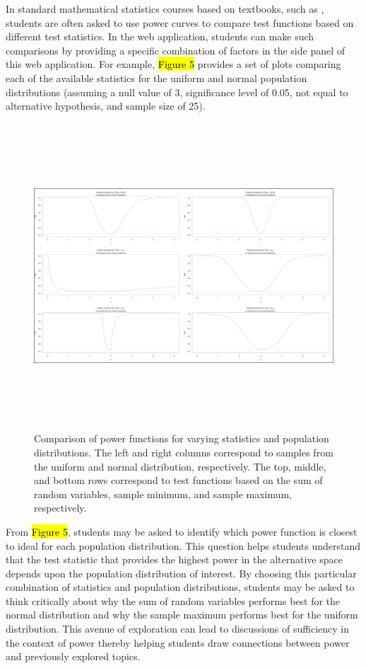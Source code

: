 \documentclass{TISE}
\begin{document}
In standard mathematical statistics courses based on textbooks, such as \cite{casella2002}, students are often asked to use power curves to compare test functions based on different test statistics. In the web application, students can make such comparisons by providing a specific combination of factors in the side panel of this web application. For example, \hl{Figure 5} provides a set of plots comparing each of the available statistics for the uniform and normal population distributions (assuming a null value of 3, significance level of 0.05, not equal to alternative hypothesis, and sample size of 25).

\begin{figure}[H]
	\centering
	\includegraphics[height=4.5in, width=6in]{varystat.png}
	\caption{Comparison of power functions for varying statistics and population distributions. The left and right columns correspond to samples from the uniform and normal distribution, respectively. The top, middle, and bottom rows correspond to test functions based on the sum of random variables, sample minimum, and sample maximum, respectively.}
\end{figure}

From \hl{Figure 5}, students may be asked to identify which power function is closest to ideal for each population distribution. This question helps students understand that the test statistic that provides the highest power in the alternative space depends upon the population distribution of interest. By choosing this particular combination of statistics and population distributions, students may be asked to think critically about why the sum of random variables performs best for the normal distribution and why the sample maximum performs best for the uniform distribution. This avenue of exploration can lead to discussions of sufficiency in the context of power thereby helping students draw connections between power and previously explored topics.  
\end{document}
